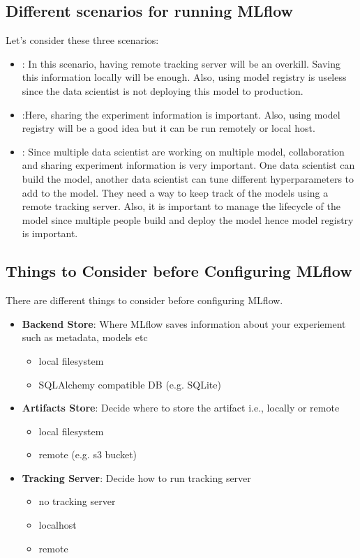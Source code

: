 \documentclass[letterpaper,12pt,notitlepage,twoside]{report}
\begin{document}
\subsection{Different scenarios for running MLflow}
Let's consider these three scenarios:
\begin{itemize}[noitemsep, topsep=0pt]
\item \textbf{}: In this scenario, having remote tracking server will be an overkill. Saving this information locally will be enough. Also, using model registry is useless since the data scientist is not deploying this model to production.
\item \textbf{}:Here, sharing the experiment information is important. Also, using model registry will be a good idea but it can be run remotely or local host.
\item \textbf{}: Since multiple data scientist are working on multiple model, collaboration and sharing experiment information is very important. One data scientist can build the model, another data scientist can tune different hyperparameters to add to the model. They need a way to keep track of the models using a remote tracking server. Also, it is important to manage the lifecycle of the model since multiple people build and deploy the model hence model registry is important. 
\end{itemize}

\subsection{Things to Consider before Configuring MLflow}
There are different things to consider before configuring MLflow.
\begin{itemize}[noitemsep, topsep=0pt]
\item \textbf{Backend Store}: Where MLflow saves information about your experiement such as metadata, models etc
	\begin{itemize}[label={}]
		\item local filesystem
		\item SQLAlchemy compatible DB (e.g. SQLite)
	\end{itemize}
\item \textbf{Artifacts Store}: Decide where to store the artifact i.e., locally or remote
	\begin{itemize}[label={}]
		\item local filesystem
		\item remote (e.g.  s3 bucket)
	\end{itemize}
\item \textbf{Tracking Server}: Decide how to run tracking server
	\begin{itemize}[label={}]
		\item no tracking server
		\item localhost
		\item remote
	\end{itemize}
\end{itemize}
\end{document}

